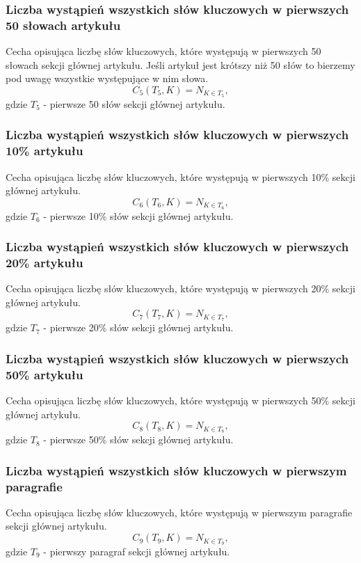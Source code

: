 \documentclass{classrep}
\begin{document}
\subsubsection{Liczba wystąpień wszystkich słów kluczowych w pierwszych 50 słowach artykułu}
Cecha opisująca liczbę słów kluczowych, które występują w pierwszych 50 słowach sekcji głównej artykułu. Jeśli artykuł jest krótszy niż 50 słów to bierzemy pod uwagę wszystkie występujące w nim słowa.
\begin{equation}
            C_{5}(T_{5},K) = N_{K \in T_{5}},
 \end{equation}	
 gdzie $T_{5}$ - pierwsze 50 słów sekcji głównej artykułu.

\subsubsection {Liczba wystąpień wszystkich słów kluczowych w pierwszych 10\% artykułu}
Cecha opisująca liczbę słów kluczowych, które występują w pierwszych 10\% sekcji głównej artykułu.
\begin{equation}
            C_{6}(T_{6},K) = N_{K \in T_{6}},
 \end{equation}	
 gdzie $T_{6}$ - pierwsze 10\% słów sekcji głównej artykułu.

\subsubsection{Liczba wystąpień wszystkich słów kluczowych w pierwszych 20\% artykułu}
Cecha opisująca liczbę słów kluczowych, które występują w pierwszych 20\% sekcji głównej artykułu.
\begin{equation}
            C_{7}(T_{7},K) = N_{K \in T_{7}},
 \end{equation}	
 gdzie $T_{7}$ - pierwsze 20\% słów sekcji głównej artykułu.

\subsubsection{Liczba wystąpień wszystkich słów kluczowych w pierwszych 50\% artykułu}
Cecha opisująca liczbę słów kluczowych, które występują w pierwszych 50\% sekcji głównej artykułu.
\begin{equation}
            C_{8}(T_{8},K) = N_{K \in T_{8}},
 \end{equation}	
 gdzie $T_{8}$ - pierwsze 50\% słów sekcji głównej artykułu.

\subsubsection{Liczba wystąpień wszystkich słów kluczowych w pierwszym paragrafie}
Cecha opisująca liczbę słów kluczowych, które występują w pierwszym paragrafie sekcji głównej artykułu.
\begin{equation}
            C_{9}(T_{9},K) = N_{K \in T_{9}},
 \end{equation}	
 gdzie $T_{9}$ - pierwszy paragraf sekcji głównej artykułu.
\end{document}
